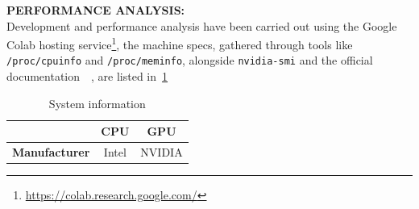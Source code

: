 \documentclass[a4paper,10pt]{article}
\begin{document}
\bigskip
{}
\makeatletter{}\makeatother\label{sec:performance-analysis}
\noindent
\textbf{PERFORMANCE ANALYSIS:}
\\
Development and performance analysis have been carried out using the Google Colab hosting service\footnote{\url{https://colab.research.google.com/}}, the machine specs, gathered through tools like \texttt{/proc/cpuinfo} and \texttt{/proc/meminfo}, alongside \texttt{nvidia-smi} and the official documentation~\cite{t4-info}~\cite{t4-product-brief}, are listed in~\ref{tbl:system}
\begin{center}
	\begin{longtable}{|c|c|c|}
		\caption{System information}\label{tbl:system}
		\\\hline\textbf{} & \textbf{CPU} & \textbf{GPU} \\\hline\hline
		\endfirsthead\hline\endlastfoot

		\textbf{Manufacturer}               & Intel                                                                                                               & NVIDIA                                                              \\\hline


\end{longtable}
\end{center}
\end{document}
